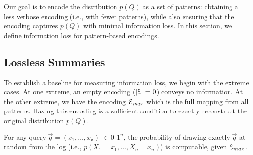 Our goal is to encode the distribution $p(Q)$ as a set of patterns: obtaining a less verbose encoding (i.e., with fewer patterns), while also ensuring that the encoding captures $p(Q)$ with minimal information loss.
In this section, we define information loss for pattern-based encodings.

\subsection{Lossless Summaries}
\label{sec:representativeness:idealdef}
To establish a baseline for measuring information loss, we begin with the extreme cases.
At one extreme, an empty encoding ($|\mathcal E| = 0$) conveys no information.
At the other extreme, we have the encoding $\mathcal E_{max}$ which is the full mapping from all patterns. 
Having this encoding is a sufficient condition to exactly reconstruct the original distribution $p(Q)$. 
\vspace*{-4mm}
\begin{proposition}
\label{PROPOSITION:LOSSLESSSUMMARY} 
For any query $\vec{q}=(x_1,\ldots,x_n)$ $\in{0,1}^n$,
the probability of drawing exactly $\vec{q}$ at random from the log (i.e., $p(X_1=x_1,\ldots,X_n=x_n)$) is computable, given $\mathcal E_{max}$.
\end{proposition}


